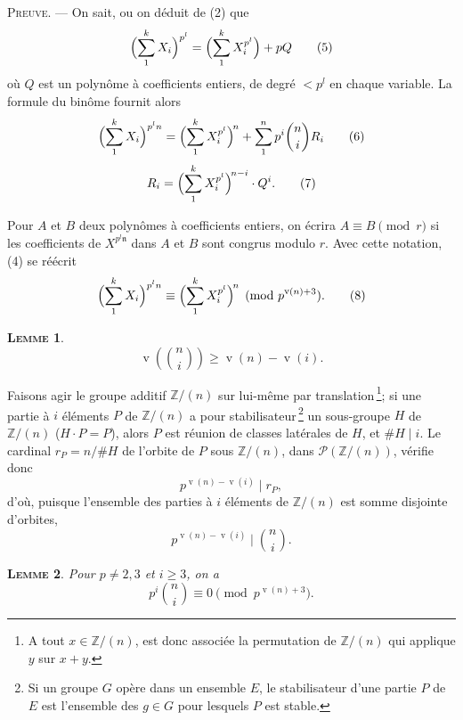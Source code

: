\documentclass[12pt]{amsart}
\theoremstyle{plain}
\newtheorem{lem}{\textsc{Lemme}}
\DeclareMathOperator{\vord}{v}
\begin{document}
\medskip
\noindent\textsc{Preuve.} --- On sait, ou on d\'eduit de (2) que
\begin{equation}
\Bigl(\sum_1^k X_i\Bigr)^{p^l} = \Bigl(\sum_1^k X_i^{p^l}\Bigr) + pQ\tag{5}
\end{equation}
o\`u $Q$ est un polyn\^ome \`a coefficients entiers, de degr\'e $< p^l$ en chaque
variable. La formule du bin\^ome fournit alors
\begin{equation}
\Bigl(\sum_1^k X_i\Bigr)^{p^l n} = \Bigl(\sum_1^k X_i^{p^l}\Bigr)^{\!n} + \sum_1^n p^i \binom{n}{i} R_i\tag{6}
\end{equation}
\begin{equation}
R_i = \Bigl(\sum_1^k X_i^{p^l}\Bigr)^{\!n-i} \cdot Q^i.\tag{7}
\end{equation}

Pour $A$ et $B$ deux polyn\^omes \`a coefficients entiers, on \'ecrira $A \equiv B \pmod{r}$
si les coefficients de $X^{p^l \mathfrak{n}}$ dans $A$ et $B$ sont congrus modulo $r$.
Avec cette notation, (4) se r\'e\'ecrit
\begin{equation}
\Bigl(\sum_1^k X_i\Bigr)^{p^l n} \equiv \Bigl(\sum_1^k X_i^{p^l}\Bigr)^{\!n} \pmod{p^{\vord(n)+3}}.\tag{8}
\end{equation}

\begin{lem}
\begin{equation}
\vord\!\left(\binom{n}{i}\right) \geqslant \vord(n) - \vord(i).\tag{9}
\end{equation}
\end{lem}

Faisons agir le groupe additif $\mathbb{Z}/(n)$ sur lui-m\^eme par translation\,\footnote{A tout
$x \in \mathbb{Z}/(n)$, est donc associ\'ee la permutation de $\mathbb{Z}/(n)$ qui applique $y$ sur
$x + y$.};
si une partie \`a $i$ \'el\'ements $P$ de $\mathbb{Z}/(n)$ a pour stabilisateur\,\footnote{Si un
groupe $G$ op\`ere dans un ensemble $E$, le stabilisateur d'une partie $P$ de $E$ est
l'ensemble des $g \in G$ pour lesquels $P$ est stable.} un sous-groupe
$H$ de $\mathbb{Z}/(n)$ ($H \cdot P = P$), alors $P$ est r\'eunion de classes lat\'erales de $H$, et
$\#H \mid i$. Le cardinal $r_P = n/\#H$ de l'orbite de $P$ sous $\mathbb{Z}/(n)$, dans
$\mathscr{P}(\mathbb{Z}/(n))$, v\'erifie donc
\[
p^{\vord(n)-\vord(i)} \mid r_P,
\]
d'o\`u, puisque l'ensemble des parties \`a $i$ \'el\'ements de $\mathbb{Z}/(n)$ est somme disjointe
d'orbites,
\[
p^{\vord(n)-\vord(i)} \mid \binom{n}{i}.
\]

\begin{lem}
Pour $p \neq 2, 3$ et $i \geqslant 3$, on a
\begin{equation}
p^i \binom{n}{i} \equiv 0 \pmod{p^{\vord(n)+3}}.\tag{10}
\end{equation}
\end{lem}
\end{document}

